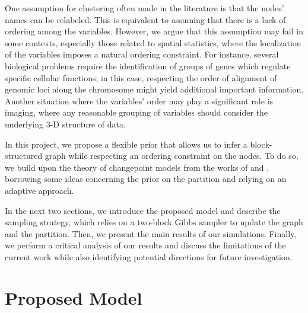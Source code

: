 One assumption for clustering often made in the literature is that the nodes' names can be relabeled. This is equivalent to assuming that there is a lack of ordering among the variables. However, we argue that this assumption may fail in some contexts, especially those related to spatial statistics, where the localization of the variables imposes a natural ordering constraint. For instance, several biological problems require the identification of groups of genes which regulate specific cellular functions; in this case, respecting the order of alignment of genomic loci along the chromosome might yield additional important information. Another situation where the variables' order may play a significant role is imaging, where any reasonable grouping of variables should consider the underlying 3-D structure of data.

In this project, we propose a flexible prior that allows us to infer a block-structured graph while respecting an ordering constraint on the nodes. To do so, we build upon the theory of changepoint models from the works of \textcite{bensonAdaptiveMCMCMultiple2018} and \parencite{martinezNonparametricChangePoint2014}, borrowing some ideas concerning the prior on the partition and relying on an adaptive approach. 

In the next two sections, we introduce the proposed model and describe the sampling strategy, which relies on a two-block Gibbs sampler to update the graph and the partition. Then, we present the main results of our simulations. Finally, we perform a critical analysis of our results and discuss the limitations of the current work while also identifying potential directions for future investigation.

 

\section{Proposed Model}


